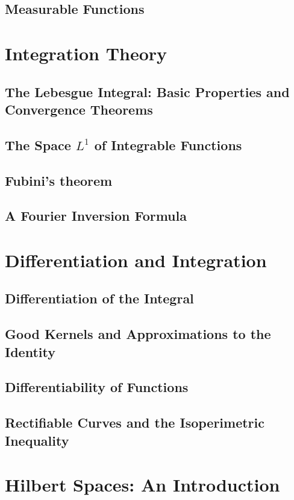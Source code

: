 \documentclass[12pt, a4paper, openany, twoside]{book}
\theoremstyle{definition}
\theoremstyle{remark}
\theoremstyle{plain}
\numberwithin{equation}{section}
\begin{document}
\newpage
\section{Measurable Functions}

\newpage



\chapter{Integration Theory}
\section{The Lebesgue Integral: Basic Properties and Convergence Theorems}
\section{The Space $L^1$ of Integrable Functions}
\section{Fubini's theorem}
\section{A Fourier Inversion Formula}

\newpage

\chapter{Differentiation and Integration}
\section{Differentiation of the Integral}
\section{Good Kernels and Approximations to the Identity}
\section{Differentiability of Functions}
\section{Rectifiable Curves and the Isoperimetric Inequality}

\newpage
\chapter{Hilbert Spaces: An Introduction}
\end{document}
